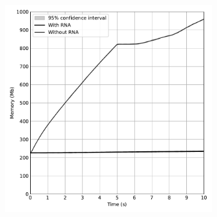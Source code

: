 \begin{figure}[htb]
\begin{subfigure}{.5\textwidth}
        \includegraphics[width=1.0\textwidth]{images/aggregated_memory_plot.pdf}
        \label{fig:rna_mem}
    \end{subfigure}
    \label{fig:rna_perf}
\end{figure}

% 
% 
